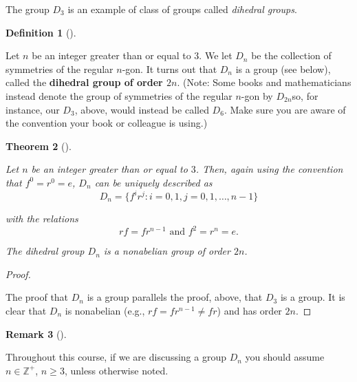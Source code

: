 \documentclass[10pt,]{book}
\newcommand{\terminology}[1]{\textbf{#1}}
\theoremstyle{plain}
\newtheorem{theorem}{Theorem}[section]
\theoremstyle{definition}
\newtheorem{definition}[theorem]{Definition}
\theoremstyle{definition}
\newtheorem{remark}[theorem]{Remark}
\theoremstyle{definition}
\theoremstyle{definition}
\numberwithin{equation}{section}
\def\Z{\mathbb{Z}}
\begin{document}
    The group \(D_3\) is an example of class of groups called \emph{dihedral groups}.
\begin{definition}[{}]\label{definition-51}

        Let \(n\) be an integer greater than or equal to \(3\). We
        let \(D_n\) be the collection of symmetries of the regular
        \(n\)-gon. It turns out that \(D_n\) is a group (see below), called
        the \terminology{dihedral group of order \(2n\)}. (Note: Some books and
        mathematicians instead denote the group of symmetries of the
        regular \(n\)-gon by \(D_{2n}\)\textemdash{}so, for instance, our \(D_3\),
        above, would instead be called \(D_6\). Make sure you are aware
        of the convention your book or colleague is using.)
\label{notation-60}
\end{definition}
\begin{theorem}[{}]\label{rf}

        Let \(n\) be an integer greater than or equal to \(3\). Then, again using the convention that \(f^0=r^0=e\), \(D_n\) can be uniquely described as
\begin{equation*}

          D_n=\{f^ir^j: i=0,1, j=0,1,\ldots, n-1\}
        
\end{equation*}

        with the relations
\begin{equation*}

          rf=fr^{n-1} \text{ and }  f^2=r^n=e.
        
\end{equation*}

\par

        The dihedral group \(D_n\) is a nonabelian group of order \(2n\).
\end{theorem}
\begin{proof}\hypertarget{proof-32}{}

      The proof that \(D_n\) is a group parallels the proof, above, that \(D_3\) is a group. It is clear that \(D_n\) is nonabelian (e.g., \(rf=fr^{n-1}\neq fr\)) and has order \(2n\).
\end{proof}
\begin{remark}[]\label{remark-33}

      Throughout this course, if we are discussing a
      group \(D_n\) you should assume \(n\in \Z^+\), \(n\geq 3\), unless
      otherwise noted.
\end{remark}
\end{document}
